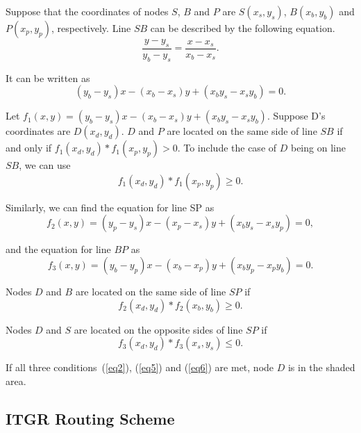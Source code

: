 \documentclass[3p,times]{elsarticle}
\begin{document}
Suppose that the coordinates of nodes $S$, $B$ and $P$ are $S(x_s,y_s)$, $B(x_b,y_b)$ and $P(x_p,y_p)$,
respectively.
Line $SB$ can be described by the following equation.
\begin{displaymath}
\frac{y-y_s}{y_b-y_s}=\frac{x-x_s}{x_b-x_s}.
\end{displaymath}

It can be written as
\begin{equation}
(y_b-y_s)x-(x_b-x_s)y+(x_by_s-x_sy_b)=0.
\label{eq1}
\end{equation}

Let $f_1(x,y) = (y_b-y_s)x-(x_b-x_s)y+(x_by_s-x_sy_b)$.
Suppose D's coordinates are $D$$(x_d,y_d)$.
$D$ and $P$ are located on the same side of line $SB$ if and only if
$f_1(x_d,y_d) * f_1(x_p, y_p) > 0$. To include
the case of $D$ being on line $SB$, we can use
\begin{equation}
f_1(x_d,y_d) * f_1(x_p, y_p) \ge 0.
\label{eq2}
\end{equation}

Similarly, we can find the equation for line SP as
\begin{equation}
f_2(x,y) = (y_p-y_s)x-(x_p-x_s)y+(x_b y_s - x_s y_p) = 0,
\label{eq3}
\end{equation}

and the equation for line $BP$ as
\begin{equation}
f_3(x,y) = (y_b-y_p)x-(x_b-x_p)y+(x_b y_p-x_p y_b) = 0.
\label{eq4}
\end{equation}

Nodes $D$ and $B$ are located on the same side of line $SP$
if
\begin{equation}
f_2(x_d,y_d) * f_2(x_b, y_b) \ge 0.
\label{eq5}
\end{equation}

Nodes $D$ and $S$ are located on the opposite sides of line $SP$
if
\begin{equation}
f_3(x_d,y_d) * f_3(x_s, y_s) \le 0.
\label{eq6}
\end{equation}

If all three conditions~(\ref{eq2}), (\ref{eq5}) and (\ref{eq6}) are met, node $D$ is in the shaded area.




\subsection{ITGR Routing Scheme}
\end{document}

